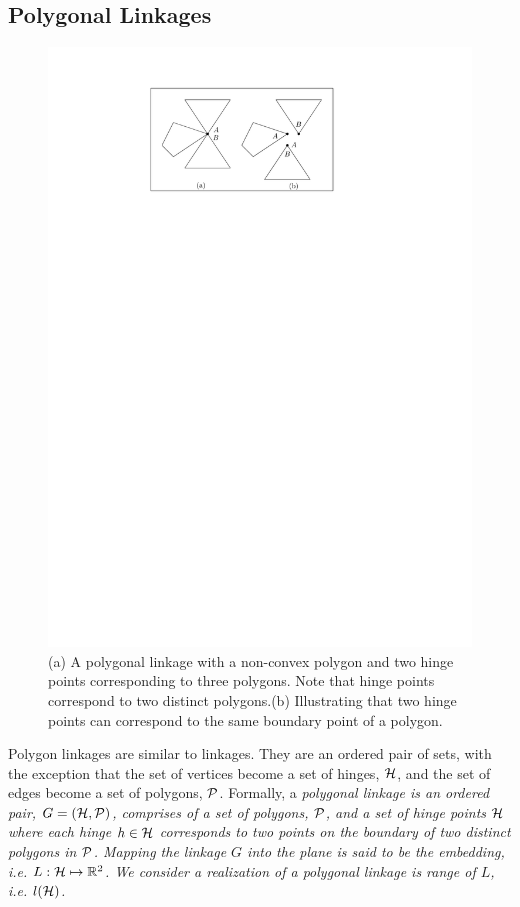 \subsection{Polygonal Linkages}
\begin{figure}[h]
\begin{center}
\includegraphics[scale=1]{graphics/hingeOnThreeDistinctPolygons.pdf}
\end{center} 
\caption{(a) A polygonal linkage with a non-convex polygon and two hinge points corresponding to 
three polygons.  Note that hinge points correspond to two distinct polygons.(b) Illustrating that 
two hinge points can correspond to the same boundary point of a polygon.}
\label{fig:linkage-1}
\end{figure}
Polygon linkages are similar to linkages.  They are an ordered pair of sets, with the exception 
that the set of vertices become a set of hinges, ${\cal H}$, and the set of edges become a set of 
polygons, ${\cal P}$.  Formally, a \it{polygonal linkage} is an ordered pair, $G = ({\cal H},{\cal P})$,  
comprises of a set of polygons, ${\cal P}$, and a set of hinge points ${\cal H}$ where each hinge $h \in {\cal H}$ 
corresponds to two points on the boundary of two distinct polygons in ${\cal P}$. Mapping the linkage 
$G$ into the plane is said to be the \textit{embedding}, i.e. $L : {\cal H} \mapsto {\mathbb{R}}^{2}$.  We 
consider a \textit{realization} of a polygonal linkage is range of $L$, i.e. $l({\cal H})$.

